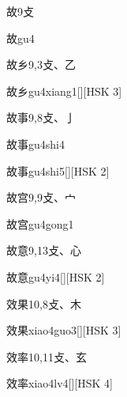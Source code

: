 \begin{entry}{故}{9}{⽁}
  \begin{phonetics}{故}{gu4}
  \end{phonetics}
\end{entry}

\begin{entry}{故乡}{9,3}{⽁、⼄}
  \begin{phonetics}{故乡}{gu4xiang1}[][HSK 3]
  \end{phonetics}
\end{entry}

\begin{entry}{故事}{9,8}{⽁、⼅}
  \begin{phonetics}{故事}{gu4shi4}
  \end{phonetics}
  \begin{phonetics}{故事}{gu4shi5}[][HSK 2]
  \end{phonetics}
\end{entry}

\begin{entry}{故宫}{9,9}{⽁、⼧}
  \begin{phonetics}{故宫}{gu4gong1}
  \end{phonetics}
\end{entry}

\begin{entry}{故意}{9,13}{⽁、⼼}
  \begin{phonetics}{故意}{gu4yi4}[][HSK 2]
  \end{phonetics}
\end{entry}

\begin{entry}{效果}{10,8}{⽁、⽊}
  \begin{phonetics}{效果}{xiao4guo3}[][HSK 3]
  \end{phonetics}
\end{entry}

\begin{entry}{效率}{10,11}{⽁、⽞}
  \begin{phonetics}{效率}{xiao4lv4}[][HSK 4]
  \end{phonetics}
\end{entry}

